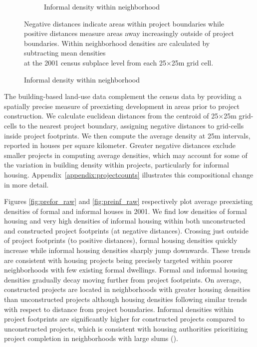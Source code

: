 \documentclass[12pt]{article}
\begin{document}
\begin{figure}[h!]
\begin{subfigure}[b]{0.495\textwidth}
            \caption[]%
            {{\small Informal density within neighborhood}}    
            \label{fig:preinf_fe}
        \end{subfigure}
        \label{fig:rawbblumeans_het}
   {\scriptsize Negative distances indicate areas within project boundaries while positive distances measure areas away increasingly outside of project boundaries.  Within neighborhood densities are calculated by subtracting mean densities  \\[-.5em] at the 2001 census subplace level from each 25$\times$25m grid cell.}
    \end{figure} 


The building-based land-use data complement the census data by providing a spatially precise measure of preexisting development in areas prior to project construction.  We calculate euclidean distances from the centroid of 25$\times$25m grid-cells to the nearest project boundary, assigning negative distances to grid-cells inside project footprints.  We then compute the average density at 25m intervals, reported in houses per square kilometer.  Greater negative distances exclude smaller projects in computing average densities, which may account for some of the variation in building density within projects, particularly for informal housing.  Appendix~\ref{appendix:projectcounts} illustrates this compositional change in more detail.  

Figures \ref{fig:prefor_raw} and \ref{fig:preinf_raw} respectively plot average preexisting densities of formal and informal houses in 2001.  We find low densities of formal housing and very high densities of informal housing within both unconstructed and constructed project footprints (at negative distances).  Crossing just outside of project footprints (to positive distances), formal housing densities quickly increase while informal housing densities sharply jump downwards.  These trends are consistent with housing projects being precisely targeted within poorer neighborhoods with few existing formal dwellings.  Formal and informal housing densities gradually decay moving further from project footprints.  On average, constructed projects are located in neighborhoods with greater housing densities than unconstructed projects although housing densities following similar trends with respect to distance from project boundaries.  Informal densities within project footprints are significantly higher for constructed projects compared to unconstructed projects, which is consistent with housing authorities prioritizing project completion in neighborhoods with large slums (\cite{hofmeyr2008risk}).  
\end{document}
